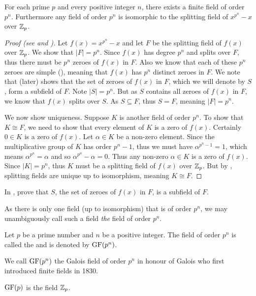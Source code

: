 \begin{theorem}\label{thrm-finite-field-is-unique}
    For each prime $p$ and every positive integer $n$, there exists a finite field of order $p^n$. Furthermore any field of order $p^n$ is isomorphic to the splitting field of $x^{p^n} - x$ over $\mathbb{Z}_p$.
\end{theorem}
\begin{proof}[Proof (see {\cite[Theorem 22.1]{gallian_2016}} and {\cite[Theorem 22.6]{judson_beezer_2022}})]
    Let $f(x) = x^{p^n} - x$ and let $F$ be the splitting field of $f(x)$ over $\mathbb{Z}_p$. We show that $|F| = p^n$. Since $f(x)$ has degree $p^n$ and splits over $F$, thus there must be $p^n$ zeroes of $f(x)$ in $F$. Also we know that each of these $p^n$ zeroes are simple (), meaning that $f(x)$ has $p^n$ distinct zeroes in $F$. We note that  (later) shows that the set of zeroes of $f(x)$ in $F$, which we will denote by $S$, form a subfield of $F$. Note $|S| = p^n$. But as $S$ contains all zeroes of $f(x)$ in $F$, we know that $f(x)$ splits over $S$. As $S \subseteq F$, thus $S = F$, meaning $|F| = p^n$.

    We now show uniqueness. Suppose $K$ is another field of order $p^n$. To show that $K \cong F$, we need to show that every element of $K$ is a zero of $f(x)$. Certainly $0 \in K$ is a zero of $f(x)$. Let $\alpha \in K$ be a non-zero element. Since the multiplicative group of $K$ has order $p^n - 1$, thus we must have $\alpha^{p^n-1} = 1$, which means $\alpha^{p^n} = \alpha$ and so $\alpha^{p^n}-\alpha = 0$. Thus any non-zero $\alpha \in K$ is a zero of $f(x)$. Since $|K| = p^n$, thus $K$ must be a splitting field of $f(x)$ over $\mathbb{Z}_p$. But by , splitting fields are unique up to isomorphism, meaning $K \cong F$.
\end{proof}

\begin{exercise}\label{exercise-zeroes-of-polynomial-form-subfield}
    In , prove that $S$, the set of zeroes of $f(x)$ in $F$, is a subfield of $F$.
\end{exercise}

As there is only one field (up to isomorphism) that is of order $p^n$, we may unambiguously call such a field \textit{the} field of order $p^n$.

\begin{definition}
    Let $p$ be a prime number and $n$ be a positive integer. The field of order $p^n$ is called the  and is denoted by $\mathrm{GF}(p^n)$.
\end{definition}
\begin{remark}
    We call $\mathrm{GF}(p^n)$ the Galois field of order $p^n$ in honour of Galois who first introduced finite fields in 1830.
\end{remark}
\begin{remark}
    $\mathrm{GF}(p)$ is the field $\mathbb{Z}_p$.
\end{remark}

